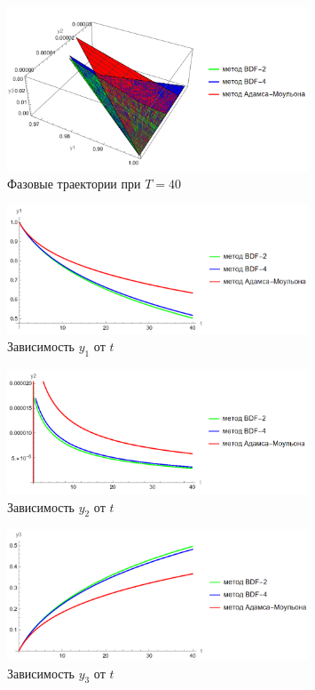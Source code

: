 \documentclass[12pt, a4paper]{article}
\begin{document}
\begin{figure}[!htbp]
	\centering
	\includegraphics[width=0.8\textwidth]{T40-0}%
	\caption{Фазовые траектории при $T = 40$}
	\vspace*{-2mm}
	\label{T40-0}
\end{figure}
\begin{figure}[!htbp]
	\centering
	\includegraphics[width=0.8\textwidth]{T40-1}%
	\caption{Зависимость $y_1$ от $t$}
	\vspace*{-2mm}
	\label{T40-1}
\end{figure}
\begin{figure}[!htbp]
	\centering
	\includegraphics[width=0.8\textwidth]{T40-2}%
	\caption{Зависимость $y_2$ от $t$}
	\vspace*{-2mm}
	\label{T40-2}
\end{figure}
\begin{figure}[!htbp]
	\centering
	\includegraphics[width=0.8\textwidth]{T40-3}%
	\caption{Зависимость $y_3$ от $t$}
	\vspace*{-2mm}
	\label{T40-3}
\end{figure}
\end{document}
